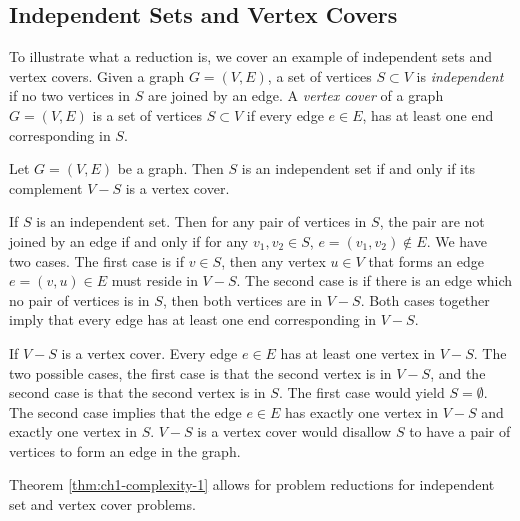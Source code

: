\subsection{Independent Sets and Vertex Covers}
To illustrate what a reduction is, we cover an example of independent sets and vertex covers.  
Given a graph $G = (V,E)$, a set of vertices $S \subset V$ is \textit{independent} if no two vertices in $S$ are joined by an edge. 
A \textit{vertex cover} of a graph $G = (V,E)$  is a set of vertices $S \subset V$ if every edge $e \in E$, has at least one end corresponding in $S$.

\begin{thm}\label{thm:ch1-complexity-1}
Let $G = (V,E)$ be a graph.  
Then $S$ is an independent set if and only if its complement $V-S$ is a vertex cover.
\end{thm}
\begin{pf}
If $S$ is an independent set. Then for any pair of vertices in $S$, the pair are not joined by an edge if and only if for any $v_1, v_2 \in S$, $e = \left( v_1, v_2 \right) \not \in E$.  
We have two cases.  
The first case is if $v \in S$, then any vertex $u \in V$ that forms an edge $e = (v,u) \in E$ must reside in $V-S$. 
The second case is if there is an edge which no pair of vertices is in $S$, then both vertices are in $V-S$.  
Both cases together imply that every edge has at least one end corresponding in $V-S$. 

If $V-S$ is a vertex cover.  
Every edge $e \in E$ has at least one vertex in $V-S$.  
The two possible cases, the first case is that the second vertex is in $V-S$, and the second case is that the second vertex is in $S$.  The first case would yield $S = \emptyset$.  
The second case implies that the edge $e \in E$ has exactly one vertex in $V-S$ and exactly one vertex in $S$.  
$V-S$ is a vertex cover would disallow $S$ to have a pair of vertices to form an edge in the graph.
\end{pf}
Theorem \ref{thm:ch1-complexity-1} allows for problem reductions for independent set and vertex cover problems.

